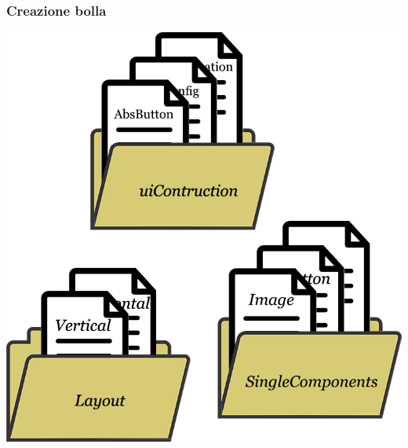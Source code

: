 \begin{frame}
	\frametitle{Creazione bolla}
    \begin{center}
        \includegraphics[scale=0.25]{img/absfile.png} \\
    \end{center}
\end{frame}
